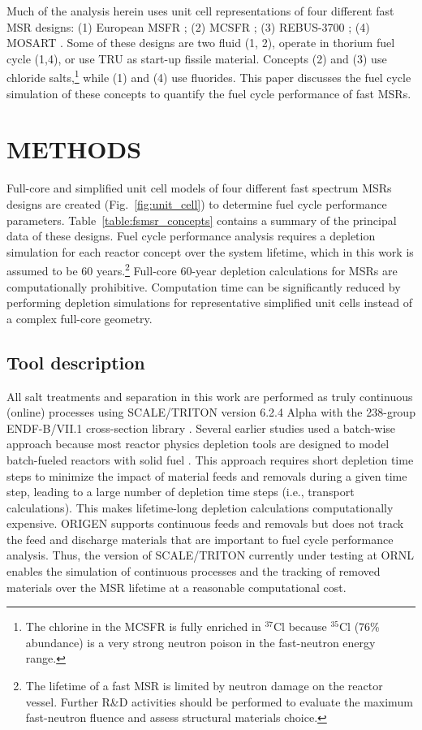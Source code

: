 \documentclass{anstrans}
\begin{document}
Much of the analysis herein uses unit cell representations of four different fast \gls{MSR} designs: 
(1) European \gls{MSFR} \cite{noauthor_final_2015}; 
(2) \gls{MCSFR} \cite{simmons_assessment_1974}; 
(3) REBUS-3700 \cite{mourogov_potentialities_2006}; 
(4) \gls{MOSART} \cite{ignatiev_progress_2007}. 
Some of these designs are two fluid (1, 2), operate in thorium fuel cycle (1,4), or use \gls{TRU} as start-up fissile material. Concepts (2) and (3) use chloride salts,\footnote{The chlorine in the \gls{MCSFR} is fully enriched in $^{37}$Cl because $^{35}$Cl (76\% abundance) is a very strong neutron poison in the fast-neutron energy range.} while (1) and (4) use fluorides. This paper discusses the fuel cycle simulation of these concepts to quantify the fuel cycle performance of fast \glspl{MSR}.

\section{METHODS} 
\label{sec:methods}
Full-core and simplified unit cell models of four different fast spectrum \glspl{MSR} designs are created (Fig.~\ref{fig:unit_cell}) to determine fuel cycle performance parameters.  Table~\ref{table:fsmsr_concepts} contains a summary of the principal data of these designs. Fuel cycle performance analysis requires a depletion simulation for each reactor concept over the system lifetime, which in this work is assumed to be 60 years.\footnote{The lifetime of a fast \gls{MSR} is limited by neutron damage on the reactor vessel. Further R\&D activities should be performed to evaluate the maximum fast-neutron fluence and assess structural materials choice.} Full-core 60-year depletion calculations for \gls{MSR}s are computationally prohibitive. Computation time can be significantly reduced by performing depletion simulations for representative simplified unit cells instead of a complex full-core geometry.

\subsection{Tool description} 
All salt treatments and separation in this work are performed as truly continuous (online) processes using SCALE/TRITON version 6.2.4 Alpha \cite{betzler_molten_2017-1} with the 238-group ENDF-B/VII.1 cross-section library \cite{rearden_scale_2016}. Several earlier studies used a batch-wise approach because most reactor physics depletion tools are designed to model batch-fueled reactors with solid fuel \cite{betzler_molten_2017, rykhlevskii_online_2017}. This approach requires short depletion time steps to minimize the impact of material feeds and removals during a given time step, leading to a large number of depletion time steps (i.e., transport calculations). This makes lifetime-long depletion calculations computationally expensive. ORIGEN \cite{gauld_isotopic_2011} supports continuous feeds and removals but does not track the feed and discharge materials that are important to fuel cycle performance analysis. Thus, the version of SCALE/TRITON currently under testing at \gls{ORNL} enables the simulation of continuous processes and the tracking of removed materials over the \gls{MSR} lifetime at a reasonable computational cost.
\end{document}
